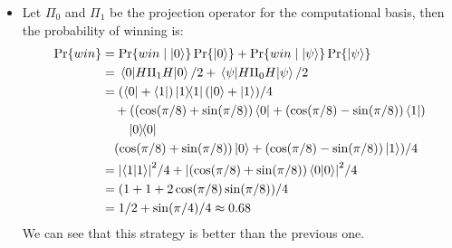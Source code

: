 \begin{itemize}
\begin{itemize}
\begin{align*}
                \pr{win}
                &= \cpr{win}{\ket{0}}\pr{\ket{0}}+ \cpr{win}{\ket{\psi}}\pr{\ket{\psi}}\\
                &= \expval{\Pi_0}{0}/2 + \expval{\Pi_1}{\psi}/2\\
                &= \abs{\braket{0}}^2/2 + \abs{\braket{1}{\psi}}^2/2\\
                &= (1 + \sin^2(\pi/8))/2 \approx 0.57
            \end{align*}
            \item[(b)] Let $\Pi_0$ and $\Pi_1$ be the projection operator for the computational basis, then the probability of winning is:
            \begin{align*}
                \pr{win}
                &= \cpr{win}{\ket{0}}\pr{\ket{0}}+ \cpr{win}{\ket{\psi}}\pr{\ket{\psi}}\\
                &= \expval{H \Pi_1 H}{0}/2 + \expval{H \Pi_0 H}{\psi}/2\\
                &= (\bra{0}+\bra{1})\dyad{1}(\ket{0}+\ket{1})/4\\
                &\quad + ((\cos(\pi/8)+\sin(\pi/8))\bra{0}+(\cos(\pi/8)-\sin(\pi/8))\bra{1})\\
                &\qquad \dyad{0}\\
                &\quad (\cos(\pi/8)+\sin(\pi/8))\ket{0}+(\cos(\pi/8)-\sin(\pi/8))\ket{1})/4\\
                &= \abs{\braket{1}}^2/4 + \abs{(\cos(\pi/8)+\sin(\pi/8))\braket{0}}^2/4\\
                &= (1 + 1 + 2\cos(\pi/8)\sin(\pi/8))/4\\
                &= 1/2 + \sin(\pi/4)/4 \approx 0.68
            \end{align*}
            We can see that this strategy is better than the previous one.
        \end{itemize}
\end{itemize}

